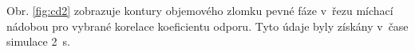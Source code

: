 Obr. \ref{fig:cd2} zobrazuje kontury objemového zlomku pevné fáze v~řezu míchací nádobou pro vybrané korelace koeficientu odporu. Tyto údaje byly získány v~čase simulace \SI{2}{\second}. 
\begin{figure}[h!]
 \centering

  \qquad             

\end{figure}
